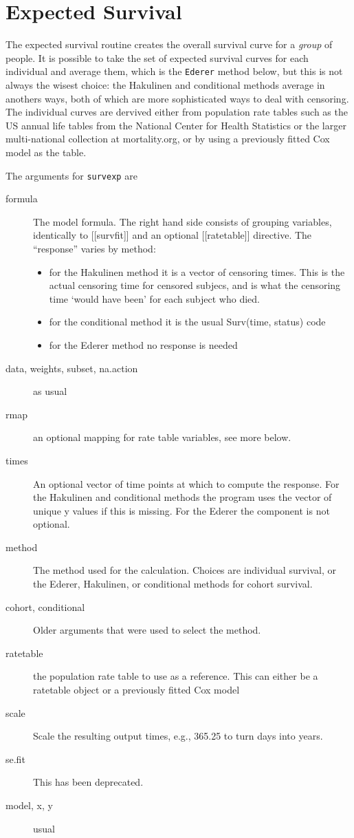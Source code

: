 \documentclass{article}
\begin{document}
\section{Expected Survival}
The expected survival routine creates the overall survival curve for a
\emph{group} of people.  It is possible to take the set of expected 
survival curves for each individual and average them, which is the
\texttt{Ederer} method below, but this is not always the wisest choice:
the Hakulinen and conditional methods average in anothers ways, both of
which are more sophisticated ways to deal with censoring.
The individual curves are dervived either from population rate tables such 
as the US annual life tables from the National Center for Health Statistics
or the larger multi-national collection at mortality.org, or by using a
previously fitted Cox model as the table.

The arguments for \Verb!survexp! are
\begin{description}
  \item[formula] The model formula.  The right hand side consists of grouping
    variables, identically to [[survfit]] and an optional [[ratetable]]
    directive.  The ``response'' varies by method:
    \begin{itemize}
      \item for the Hakulinen method it is a vector of censoring times.  This is
        the actual censoring time for censored subjecs, and is what the 
        censoring time `would have been' for each subject who died.         %
      \item for the conditional method it is the usual Surv(time, status) code
      \item for the Ederer method no response is needed
    \end{itemize}
  \item[data, weights, subset, na.action] as usual
  \item[rmap] an optional mapping for rate table variables, see more below.
  \item[times] An optional vector of time points at which to compute the
    response.  For the Hakulinen and conditional methods the program uses the
    vector of unique y values if this is missing.  For the Ederer the component
    is not optional.
  \item[method] The method used for the calculation.  Choices are individual
    survival, or the Ederer, Hakulinen, or conditional methods for cohort
    survival.
  \item[cohort, conditional] Older arguments that were used to select the
    method.
  \item[ratetable] the population rate table to use as a reference.  This can
    either be a ratetable object or a previously fitted Cox model
  \item[scale] Scale the resulting output times, e.g., 365.25 to turn days into
    years.
  \item[se.fit] This has been deprecated.
  \item[model, x, y] usual
\end{description}
\end{document}
